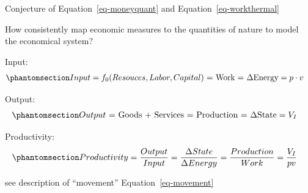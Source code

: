 \documentclass[
  letterpaper,
  DIV=11,
  numbers=noendperiod]{scrartcl}
\begin{document}
Conjecture of Equation~\ref{eq-moneyquant} and
Equation~\ref{eq-workthermal}

How consistently map economic measures to the quantities of nature to
model the economical system?

Input:
\begin{equation}\phantomsection\label{eq-ecoinput}{\begin{split} &
Input = f_0(Resouces, Labor, Capital) \text{ = Work = } \Delta\text{Energy} = p \cdot v
\end{split}}\end{equation}

Output:
\begin{equation}\phantomsection\label{eq-ecooutput}{\begin{split} &
Output \text{ = Goods + Services = Production = } \Delta\text{State} = V_I 
\end{split}}\end{equation}

Productivity:
\begin{equation}\phantomsection\label{eq-ecooutput}{\begin{split} &
Productivity = \frac{Output}{Input} = \frac{\Delta State}{\Delta Energy} = \frac{Production}{Work} = \frac{V_I}{pv}
\end{split}}\end{equation}

see description of ``movement'' Equation~\ref{eq-movement}

\hfill\break
\hfill\break
\end{document}
